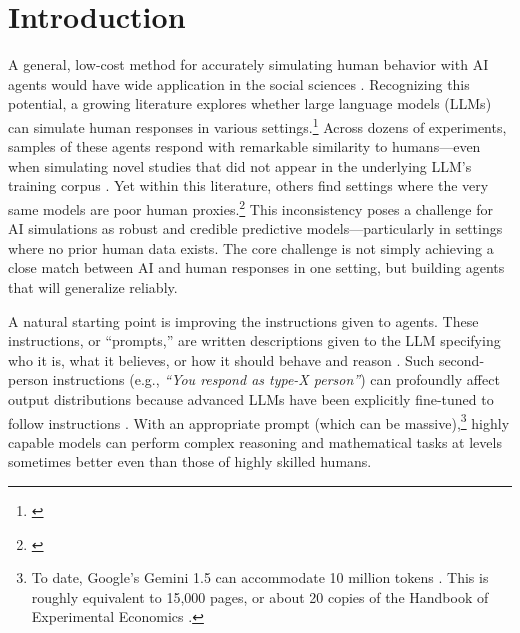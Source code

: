 \documentclass[11pt]{article}
\theoremstyle{definition}
\newcommand{\persona}{prompt}
\begin{document}
\onehalfspacing
\newpage \clearpage
{}

\section{Introduction} 
\label{sec:introduction}

A general, low-cost method for accurately simulating human behavior with AI agents would have wide application in the social sciences \citep{Charness2025NextGen,jackson2025ai,promising2025LLM}.
Recognizing this potential, a growing literature explores whether large language models (LLMs) can simulate human responses in various settings.\footnote{\citep{argyle2022out,aher2022using,binz2023cognitive,brand2023using,park2023generative,
jackson2024turing,1000agents2024park,chang2024networks,Manning2024Automated,
capra2024llms,hansen2024simulating,kim2024homoeconomicus,
wang2025market,Duch2025Possum,zhu2025evidence,Broska2025Mixed,
bybee2025ghost,fish2025collusion}}
Across dozens of experiments, samples of these agents respond with remarkable similarity to humans---even when simulating novel studies that did not appear in the underlying LLM's training corpus \citep{hewitt2024predictingLLM,binz2025centaur,ValidityLLM2024,Tranchero2024LLMtheorizing,suh2025finetuningscaled}.
Yet within this literature, others find settings where the very same models are poor human proxies.\footnote{\citep{opinions2023Santukar,WhichHumans:2023,Cheng2023caricature,Gui2023Causal,gao2024caution}}
This inconsistency poses a challenge for AI simulations as robust and credible predictive models---particularly in settings where no prior human data exists.
The core challenge is not simply achieving a close match between AI and human responses in one setting, but building agents that will generalize reliably.

A natural starting point is improving the instructions given to agents.
These instructions, or ``\persona{s},'' are written descriptions given to the LLM specifying who it is, what it believes, or how it should behave and reason \citep{horton2023large}.
Such second-person instructions (e.g., \emph{``You respond as type-X person''}) can profoundly affect output distributions because advanced LLMs have been explicitly fine-tuned to follow instructions \citep{bai2022helpfulharmless,ouyang2022training}.
With an appropriate prompt (which can be massive),\footnote{To date, Google's Gemini 1.5 can accommodate 10 million tokens \citep{Gemini152024}. 
This is roughly equivalent to 15{,}000 pages, or about 20 copies of the Handbook of Experimental Economics \citep{Kagel1995Handbook}.} highly capable models can perform complex reasoning and mathematical tasks at levels sometimes better even than those of highly skilled humans.
\end{document}
